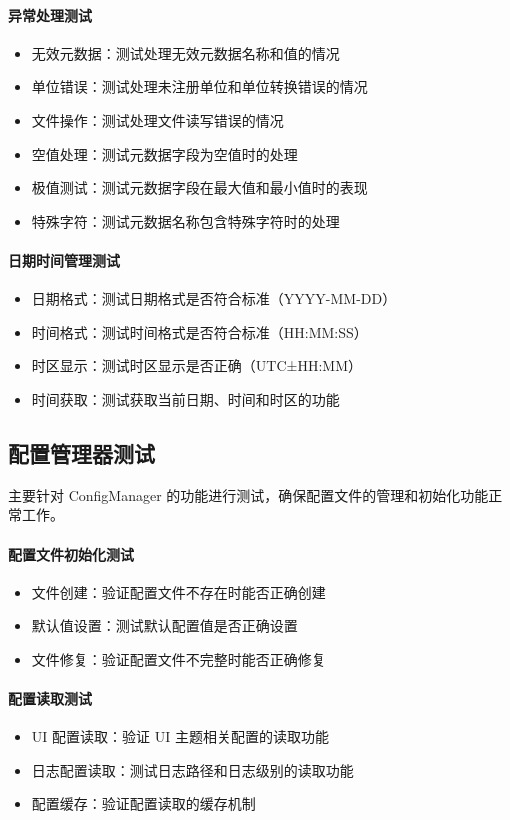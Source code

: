 \documentclass[a4paper,12pt]{report}	%
\begin{document}
\paragraph{异常处理测试}
\begin{itemize}
    \item 无效元数据：测试处理无效元数据名称和值的情况
    \item 单位错误：测试处理未注册单位和单位转换错误的情况
    \item 文件操作：测试处理文件读写错误的情况
    \item 空值处理：测试元数据字段为空值时的处理
    \item 极值测试：测试元数据字段在最大值和最小值时的表现
    \item 特殊字符：测试元数据名称包含特殊字符时的处理
\end{itemize}

\paragraph{日期时间管理测试}
\begin{itemize}
    \item 日期格式：测试日期格式是否符合标准（YYYY-MM-DD）
    \item 时间格式：测试时间格式是否符合标准（HH:MM:SS）
    \item 时区显示：测试时区显示是否正确（UTC±HH:MM）
    \item 时间获取：测试获取当前日期、时间和时区的功能
\end{itemize}

\subsection{配置管理器测试}

主要针对 ConfigManager 的功能进行测试，确保配置文件的管理和初始化功能正常工作。

\paragraph{配置文件初始化测试}
\begin{itemize}
    \item 文件创建：验证配置文件不存在时能否正确创建
    \item 默认值设置：测试默认配置值是否正确设置
    \item 文件修复：验证配置文件不完整时能否正确修复
\end{itemize}

\paragraph{配置读取测试}
\begin{itemize}
    \item UI 配置读取：验证 UI 主题相关配置的读取功能
    \item 日志配置读取：测试日志路径和日志级别的读取功能
    \item 配置缓存：验证配置读取的缓存机制
\end{itemize}
\end{document}
